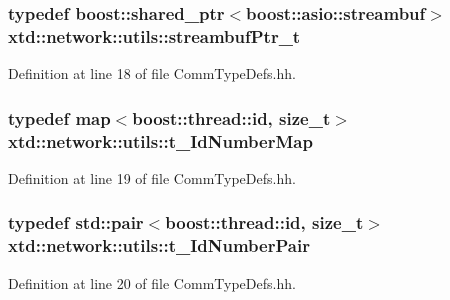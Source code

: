 \subsubsection[{\texorpdfstring{streambuf\+Ptr\+\_\+t}{streambufPtr_t}}]{\setlength{\rightskip}{0pt plus 5cm}typedef boost\+::shared\+\_\+ptr$<$boost\+::asio\+::streambuf$>$ {\bf xtd\+::network\+::utils\+::streambuf\+Ptr\+\_\+t}}\hypertarget{namespacextd_1_1network_1_1utils_aaaf1b50be1864a40d85efd18979631e1}{}\label{namespacextd_1_1network_1_1utils_aaaf1b50be1864a40d85efd18979631e1}


Definition at line 18 of file Comm\+Type\+Defs.\+hh.

\subsubsection[{\texorpdfstring{t\+\_\+\+Id\+Number\+Map}{t_IdNumberMap}}]{\setlength{\rightskip}{0pt plus 5cm}typedef map$<$boost\+::thread\+::id, size\+\_\+t$>$ {\bf xtd\+::network\+::utils\+::t\+\_\+\+Id\+Number\+Map}}\hypertarget{namespacextd_1_1network_1_1utils_a778bf7884b2296561ffc1fc5a5f14e38}{}\label{namespacextd_1_1network_1_1utils_a778bf7884b2296561ffc1fc5a5f14e38}


Definition at line 19 of file Comm\+Type\+Defs.\+hh.

\subsubsection[{\texorpdfstring{t\+\_\+\+Id\+Number\+Pair}{t_IdNumberPair}}]{\setlength{\rightskip}{0pt plus 5cm}typedef std\+::pair$<$boost\+::thread\+::id, size\+\_\+t$>$ {\bf xtd\+::network\+::utils\+::t\+\_\+\+Id\+Number\+Pair}}\hypertarget{namespacextd_1_1network_1_1utils_aa6bd02256b6023347de116a773dd9500}{}\label{namespacextd_1_1network_1_1utils_aa6bd02256b6023347de116a773dd9500}


Definition at line 20 of file Comm\+Type\+Defs.\+hh.

